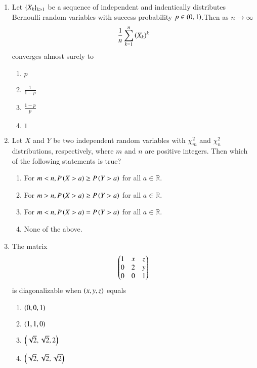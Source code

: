 \documentclass[journal,12pt,onecolumn]{IEEEtran}
\theoremstyle{remark}
\begin{document}
\begin{enumerate}
\begin{multicols}{4}
\begin{enumerate}
    \item $\frac{-e^{-x}}{1+x}$
      \item $\frac{-e^{-x}}{1+x^2}$
        \item $\frac{-e^{-x}}{1-x}$
         \item $-\brak{1+x}e^{-x}$
\end{enumerate}
\end{multicols}
\item Let $\left\{X_k\right\}_{k\geq 1}$ be a sequence of independent and indentically distributes Bernoulli random variables with success probability $p \in \left(0,1\right)$.Then as $n \rightarrow \infty$
\begin{align}
    \frac{1}{n} \sum_{k=1}^n \left(X_k\right)^k
\end{align}
converges almost surely to
\begin{multicols}{4}
\begin{enumerate}
    \item $p$
    \item $\frac{1}{1-p}$
    \item $\frac{1-p}{p}$
    \item $1$
\end{enumerate}
\end{multicols}
\item Let $X$ and $Y$ be two independent random variables with $\chi^2_m$ and $\chi^2_n$ distributions, respectively, where $m$ and $n$ are positive integers. Then which of the following statements is true?

\begin{enumerate}
    \item For $m < n, P\left(X > a\right) \geq P\left(Y > a\right)$ for all $a \in \mathbb{R}$.
    \item For $m > n, P\left(X > a\right) \geq P\left(Y > a\right)$ for all $a \in \mathbb{R}$.
    \item For $m < n, P\left(X > a\right) = P\left(Y > a\right)$ for all $a \in \mathbb{R}$.
    \item None of the above.
\end{enumerate}
\item The matrix
\begin{align}
\begin{pmatrix}
1 & x & z \\
0 & 2 & y \\
0 & 0 & 1\end{pmatrix}
\end{align}
is diagonalizable when $\left(x, y, z\right)$ equals

\begin{enumerate}
    \item $\left(0, 0, 1\right)$
    \item $\left(1, 1, 0\right)$
    \item $\left(\sqrt{2}, \sqrt{2}, 2\right)$
    \item $\left(\sqrt{2}, \sqrt{2}, \sqrt{2}\right)$
\end{enumerate}

\end{enumerate}
\end{document}

